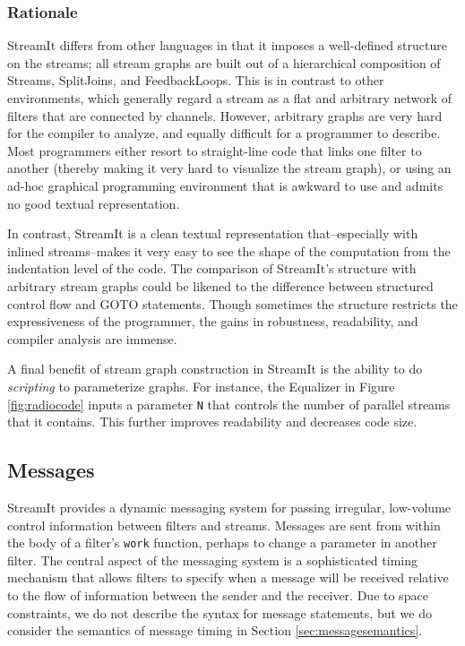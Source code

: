 \subsubsection{Rationale}

StreamIt differs from other languages in that it imposes a
well-defined structure on the streams; all stream graphs are built out
of a hierarchical composition of Streams, SplitJoins, and
FeedbackLoops.  This is in contrast to other environments, which
generally regard a stream as a flat and arbitrary network of filters
that are connected by channels.  However, arbitrary graphs are very
hard for the compiler to analyze, and equally difficult for a
programmer to describe.  Most programmers either resort to
straight-line code that links one filter to another (thereby making it
very hard to visualize the stream graph), or using an ad-hoc graphical
programming environment that is awkward to use and admits no good
textual representation.

In contrast, StreamIt is a clean textual representation
that--especially with inlined streams--makes it very easy to see the
shape of the computation from the indentation level of the code.  The
comparison of StreamIt's structure with arbitrary stream graphs could
be likened to the difference between structured control flow and GOTO
statements.  Though sometimes the structure restricts the
expressiveness of the programmer, the gains in robustness,
readability, and compiler analysis are immense.

A final benefit of stream graph construction in StreamIt is the
ability to do {\it scripting} to parameterize graphs.  For instance,
the Equalizer in Figure \ref{fig:radiocode} inputs a parameter {\tt N}
that controls the number of parallel streams that it contains.  This
further improves readability and decreases code size.

\subsection{Messages}

StreamIt provides a dynamic messaging system for passing irregular,
low-volume control information between filters and streams.  Messages
are sent from within the body of a filter's {\tt work} function,
perhaps to change a parameter in another filter.  The central aspect
of the messaging system is a sophisticated timing mechanism that
allows filters to specify when a message will be received relative to
the flow of information between the sender and the receiver.  Due to
space constraints, we do not describe the syntax for message
statements, but we do consider the semantics of message timing in
Section \ref{sec:messagesemantics}.

